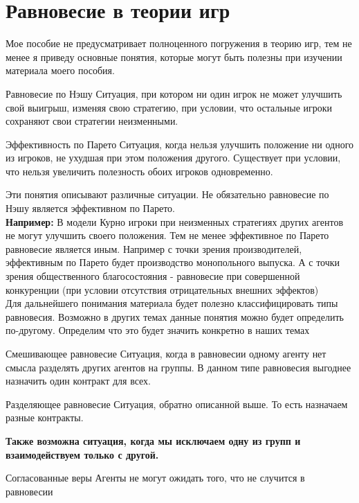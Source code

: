 \section{Равновесие в теории игр}
\indent\setlength{\parindent}{1em}Мое пособие не предусматривает полноценного погружения в теорию игр, тем не менее я приведу основные понятия, которые могут быть полезны при изучении материала моего пособия.
\begin{mybox}{Равновесие по Нэшу}
Ситуация, при котором ни один игрок не может улучшить свой выигрыш, изменяя свою стратегию, при условии, что остальные игроки сохраняют свои стратегии неизменными.
\end{mybox}
\begin{mybox}{Эффективность по Парето}
Ситуация, когда нельзя улучшить положение ни одного из игроков, не ухудшая при этом положения другого. Существует при условии, что нельзя увеличить полезность обоих игроков одновременно.
\end{mybox}
Эти понятия описывают различные ситуации. Не обязательно равновесие по Нэшу является эффективном по Парето. \smallskip\\ \indent\setlength{\parindent}{1em} \textbf{Например:} В модели Курно игроки при неизменных стратегиях других агентов не могут улучшить своего положения. Тем не менее эффективное по Парето равновесие является иным. Например с точки зрения производителей, эффективным по Парето будет производство монопольного выпуска. А с точки зрения общественного благосостояния - равновесие при совершенной конкуренции (при условии отсутствия отрицательных внешних эффектов)\smallskip\\\indent\setlength{\parindent}{1em} Для дальнейшего понимания материала будет полезно классифицировать типы равновесия. Возможно в других темах данные понятия можно будет определить по-другому. Определим что это будет значить конкретно в наших темах
\begin{mybox}{Смешивающее равновесие}
Ситуация, когда в равновесии одному агенту нет смысла разделять других агентов на группы. В данном типе равновесия выгоднее назначить один контракт для всех.
\end{mybox}
\begin{mybox}{Разделяющее равновесие}
Ситуация, обратно описанной выше. То есть назначаем разные контракты.
\end{mybox}
\begin{mybox_2}
\textbf{Также возможна ситуация, когда мы исключаем одну из групп и взаимодействуем только с другой. }
\end{mybox_2}
\begin{mybox}{Согласованные веры}
Агенты не могут ожидать того, что не случится в равновесии
\end{mybox}

